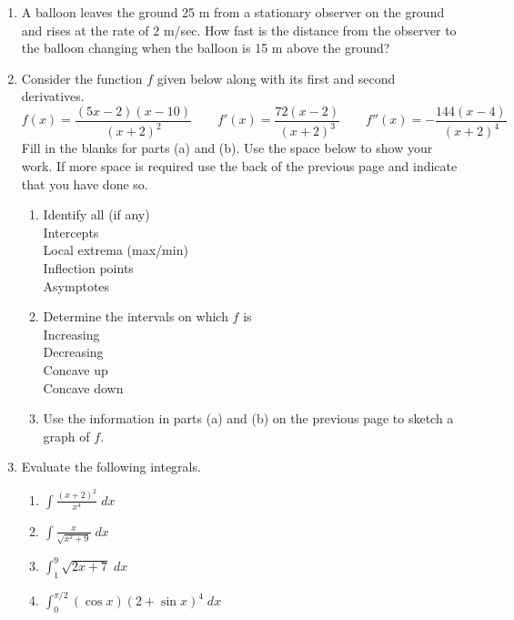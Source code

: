 \documentclass[12pt]{article}
\newcommand{\ds}{\displaystyle}
\begin{document}
\begin{enumerate}
\begin{floatingfigure}{2in}
  \end{floatingfigure}
  \quad
\vfill
\newpage
\item A balloon leaves the ground 25 m from a
  stationary observer on the ground
  and rises at the rate of 2 m/sec.  How fast is the distance 
  from the observer to the balloon changing when the balloon is 15 m above
  the ground?  
\vfill
\newpage
\item Consider the function $f$ given below
  along with its first and second derivatives.
  \begin{displaymath}
    f(x) = \frac{(5x-2)(x-10)}{(x+2)^2}
    \qquad
    f'(x) = \frac{72(x-2)}{(x+2)^3}
    \qquad
    f''(x) = -\frac{144(x-4)}{(x+2)^4}
  \end{displaymath}
  Fill in the blanks for parts (a) and (b).  Use the space below to show
  your work.  If more space is required use the back of the previous page
  and indicate that you have done so.
  \begin{enumerate}
  \item Identify all (if any)\\
    Intercepts \hrulefill\\
    Local extrema (max/min) \hrulefill\\
    Inflection points \hrulefill\\
    Asymptotes \hrulefill
  \item Determine the intervals on which $f$ is\\
    Increasing \hrulefill\\
    Decreasing \hrulefill\\
    Concave up \hrulefill\\
    Concave down \hrulefill\\
\vfill
\newpage
  \item Use the information in parts (a) and (b) on the previous page to
    sketch a graph of $f$.
  \end{enumerate}
\vfill
\newpage
\item Evaluate
  the following integrals.
  \begin{enumerate}
  \item $\ds \int\frac{(x+2)^2}{x^4} \; dx$
\vfill
  \item $\ds \int\frac{x}{\sqrt{x^2+9}} \; dx$
\vfill
  \item $\ds \int_1^9 \sqrt{2x+7} \; dx$
\vfill
  \item $\ds \int_0^{\pi/2} (\cos x)(2+\sin x)^4 \; dx$

\end{enumerate}
\end{enumerate}
\end{document}
